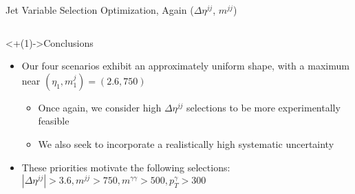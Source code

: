 \documentclass[handout]{beamer}
\begin{document}
\begin{frame}{Jet Variable Selection Optimization, Again ($\Delta \eta^{jj}$, $m^{jj}$)}
    \begin{columns}
    \end{columns}
    
    \begin{block}<+(1)->{Conclusions}
        \begin{itemize}[<+(1)->]
            \item Our four scenarios exhibit an approximately uniform shape, with a maximum near $(\eta_1, m^j_1) = (2.6, 750)$
            \begin{itemize}[<+(1)->]
                \item Once again, we consider high $\Delta \eta^{jj}$ selections to be more experimentally feasible
                \item We also seek to incorporate a realistically high systematic uncertainty
            \end{itemize}
            \item These priorities motivate the following selections: $|\Delta \eta^{jj}| > 3.6, m^{jj} > 750, m^{\gamma \gamma} > 500, p_T^\gamma > 300$
        \end{itemize}
    \end{block}
\end{frame}
\end{document}
